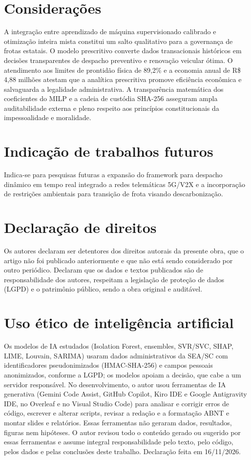\documentclass[12pt,a4paper]{article}
\begin{document}
\section{Considerações}

A integração entre aprendizado de máquina supervisionado calibrado e otimização inteira mista constitui um salto qualitativo para a governança de frotas estatais. O modelo prescritivo converte dados transacionais históricos em decisões transparentes de despacho preventivo e renovação veicular ótima. O atendimento aos limites de prontidão física de 89,2\% e a economia anual de R\$ 4,88 milhões atestam que a analítica prescritiva promove eficiência econômica e salvaguarda a legalidade administrativa. A transparência matemática dos coeficientes do MILP e a cadeia de custódia SHA-256 asseguram ampla auditabilidade externa e pleno respeito aos princípios constitucionais da impessoalidade e moralidade.


\section{Indicação de trabalhos futuros}

Indica-se para pesquisas futuras a expansão do framework para despacho dinâmico em tempo real integrado a redes telemáticas 5G/V2X e a incorporação de restrições ambientais para transição de frota visando descarbonização.


\section{Declaração de direitos}

Os autores declaram ser detentores dos direitos autorais da presente obra, que o artigo não foi publicado anteriormente e que não está sendo considerado por outro periódico. Declaram que os dados e textos publicados são de responsabilidade dos autores, respeitam a legislação de proteção de dados (LGPD) e o patrimônio público, sendo a obra original e auditável.


\section*{Uso ético de inteligência artificial}
Os modelos de IA estudados (Isolation Forest, ensembles, SVR/SVC, SHAP, LIME, Louvain, SARIMA) usaram dados administrativos da SEA/SC com identificadores pseudonimizados (HMAC-SHA-256) e campos pessoais anonimizados, conforme a LGPD; os modelos apoiam a decisão, que cabe a um servidor responsável. No desenvolvimento, o autor usou ferramentas de IA generativa (Gemini Code Assist, GitHub Copilot, Kiro IDE e Google Antigravity IDE, no Overleaf e no Visual Studio Code) para analisar e corrigir erros de código, escrever e alterar scripts, revisar a redação e a formatação ABNT e montar slides e relatórios. Essas ferramentas não geraram dados, resultados, figuras nem hipóteses. O autor revisou todo o conteúdo gerado ou sugerido por essas ferramentas e assume integral responsabilidade pelo texto, pelo código, pelos dados e pelas conclusões deste trabalho. Declaração feita em 16/11/2026.
\end{document}
